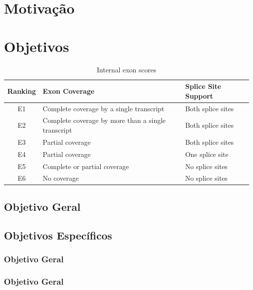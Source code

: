 \lipsum[2]
\lipsum[2]

\section{Motivação}
\lipsum[2]
\lipsum[2]

\section{Objetivos}

\lipsum[2]
\lipsum[2]
\lipsum[2]
\lipsum[2]
\lipsum[2]
\begin{table}[h!]	
	\caption{Internal exon scores}
	\label{tab:internal}
	\centering
	\begin{tabular}{|c|l|l|}
		\hline
		Ranking & Exon Coverage & Splice Site Support\\
		\hline
		E1 & Complete coverage by a single transcript & Both splice sites\\
		E2 & Complete coverage by more than a single transcript & Both splice sites\\
		E3 & Partial coverage & Both splice sites\\
		E4 & Partial coverage & One splice site\\
		E5 & Complete or partial coverage & No splice sites\\
		E6 & No coverage & No splice sites\\
		\hline
	\end{tabular}
\end{table}

\lipsum[2]
\subsection{Objetivo Geral}
\lipsum[2]

\subsection{Objetivos Específicos}
	\lipsum[2]
	
	\begin{alineas}
		\item \lipsum[2]
		\item \lipsum[2]
		\begin{alineas}
			\item \lipsum[2]
			\item \lipsum[2]
		\end{alineas}
		\item \lipsum[2]	
	\end{alineas}
	
	\lipsum[2]
\subsubsection{Objetivo Geral}
	\lipsum[2]
	
\subsubsection{Objetivo Geral}
	\lipsum[2]
	